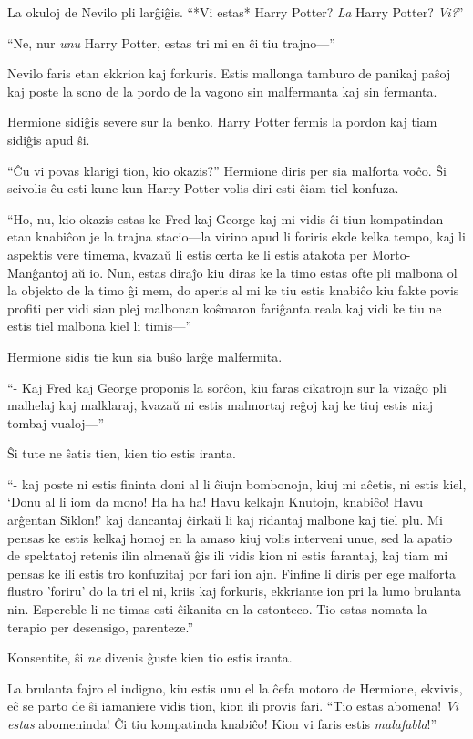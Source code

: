 La okuloj de Nevilo pli larĝiĝis. ``*Vi estas* Harry Potter? \emph{La}
Harry Potter? \emph{Vi?}''

``Ne, nur \emph{unu} Harry Potter, estas tri mi en ĉi tiu trajno—''

Nevilo faris etan ekkrion kaj forkuris. Estis mallonga tamburo de
panikaj paŝoj kaj poste la sono de la pordo de la vagono sin
malfermanta kaj sin fermanta.

Hermione sidiĝis severe sur la benko. Harry Potter fermis la pordon
kaj tiam sidiĝis apud ŝi.

``Ĉu vi povas klarigi tion, kio okazis?'' Hermione diris per sia
malforta voĉo. Ŝi scivolis ĉu esti kune kun Harry Potter volis diri
esti ĉiam tiel konfuza.

``Ho, nu, kio okazis estas ke Fred kaj George kaj mi vidis ĉi tiun
kompatindan etan knabiĉon je la trajna stacio—la virino apud li
foriris ekde kelka tempo, kaj li aspektis vere timema, kvazaŭ li estis
certa ke li estis atakota per Morto-Manĝantoj aŭ io.  Nun, estas
diraĵo kiu diras ke la timo estas ofte pli malbona ol la objekto de la
timo ĝi mem, do aperis al mi ke tiu estis knabiĉo kiu fakte povis
profiti per vidi sian plej malbonan koŝmaron fariĝanta reala kaj vidi
ke tiu ne estis tiel malbona kiel li timis—''

Hermione sidis tie kun sia buŝo larĝe malfermita.

``- Kaj Fred kaj George proponis la sorĉon, kiu faras cikatrojn sur la
vizaĝo pli malhelaj kaj malklaraj, kvazaŭ ni estis malmortaj reĝoj kaj
ke tiuj estis niaj tombaj vualoj—''

Ŝi tute ne ŝatis tien, kien tio estis iranta.

``- kaj poste ni estis fininta doni al li ĉiujn bombonojn, kiuj mi
aĉetis, ni estis kiel, `Donu al li iom da mono! Ha ha ha! Havu kelkajn
Knutojn, knabiĉo!  Havu arĝentan Siklon!' kaj dancantaj ĉirkaŭ li kaj
ridantaj malbone kaj tiel plu. Mi pensas ke estis kelkaj homoj en la
amaso kiuj volis interveni unue, sed la apatio de spektatoj retenis
ilin almenaŭ ĝis ili vidis kion ni estis farantaj, kaj tiam mi pensas
ke ili estis tro konfuzitaj por fari ion ajn. Finfine li diris per ege
malforta flustro 'foriru' do la tri el ni, kriis kaj forkuris,
ekkriante ion pri la lumo brulanta nin. Espereble li ne timas esti
ĉikanita en la estonteco. Tio estas nomata la terapio per desensigo,
parenteze.''

Konsentite, ŝi \emph{ne} divenis ĝuste kien tio estis iranta.

La brulanta fajro el indigno, kiu estis unu el la ĉefa motoro de
Hermione, ekvivis, eĉ se parto de ŝi iamaniere vidis tion, kion ili
provis fari. ``Tio estas abomena! \emph{Vi estas} abomeninda! Ĉi
tiu kompatinda knabiĉo! Kion vi faris estis \emph{malafabla}!''

